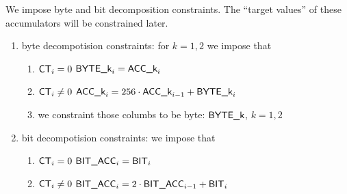We impose byte and bit decomposition constraints.
The ``target values'' of these accumulators will be constrained later.
\begin{enumerate}
    \item byte decompotision constraints: for $k = 1,2$ we impose that
        \begin{enumerate}
            \item \If $\textsf{CT}_{i} = 0$ \Then $\textsf{BYTE}\textsf{\_k}_{i} = \textsf{ACC}\textsf{\_k}_{i}$
            \item \If $\textsf{CT}_{i} \ne 0$  \Then $\textsf{ACC}\textsf{\_k}_{i} = 256 \cdot \textsf{ACC}\textsf{\_k}_{i-1} + \textsf{BYTE}\textsf{\_k}_{i}$
            \item we constraint those columbs to be byte: $\textsf{BYTE}\textsf{\_k}$, $k = 1,2$
        \end{enumerate}
    \item bit decompotision constraints: we impose that
        \begin{enumerate}
            \item \If $\textsf{CT}_{i} = 0$ \Then $\textsf{BIT}\textsf{\_}\textsf{ACC}_{i} = \textsf{BIT}_{i}$
            \item \If $\textsf{CT}_{i} \ne 0$  \Then $\textsf{BIT}\textsf{\_}\textsf{ACC}_{i} = 2 \cdot \textsf{BIT}\textsf{\_}\textsf{ACC}_{i-1} + \textsf{BIT}_{i}$
        \end{enumerate}
\end{enumerate}
